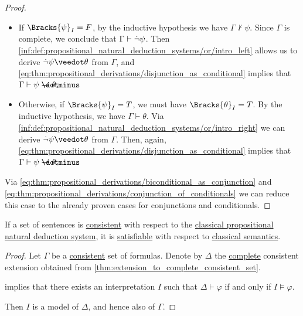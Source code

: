 \begin{proof}
  \begin{itemize}
    \item If \( \Bracks{\psi}_I = F \), by the inductive hypothesis we have \( \Gamma \not\vdash \psi \). Since \( \Gamma \) is complete, we conclude that \( \Gamma \vdash \dot{\neg} \psi \). Then \ref{inf:def:propositional_natural_deduction_systems/or/intro_left} allows us to derive \( \synneg \psi \synvee \theta \) from \( \Gamma \), and \eqref{eq:thm:propositional_derivations/disjunction_as_conditional} implies that \( \Gamma \vdash \psi \synimplies \theta \).

    \item Otherwise, if \( \Bracks{\psi}_I = T \), we must have \( \Bracks{\theta}_I = T \). By the inductive hypothesis, we have \( \Gamma \vdash \theta \). Via \ref{inf:def:propositional_natural_deduction_systems/or/intro_right} we can derive \( \synneg \psi \synvee \theta \) from \( \Gamma \). Then, again, \eqref{eq:thm:propositional_derivations/disjunction_as_conditional} implies that \( \Gamma \vdash \psi \synimplies \theta \).
  \end{itemize}

   Via \eqref{eq:thm:propositional_derivations/biconditional_as_conjunction} and \eqref{eq:thm:propositional_derivations/conjunction_of_conditionals} we can reduce this case to the already proven cases for conjunctions and conditionals.
\end{proof}

\begin{corollary}\label{thm:consistent_implies_satisfiable}
  If a set of sentences is \hyperref[def:consistent_set_of_sentences]{consistent} with respect to the \hyperref[def:abstract_natural_deduction_system]{classical propositional natural deduction system}, it is \hyperref[def:satisfiable_set_of_sentences]{satisfiable} with respect to \hyperref[def:propositional_semantics/classical]{classical semantics}.
\end{corollary}
\begin{proof}
  Let \( \Gamma \) be a \hyperref[def:consistent_set_of_sentences]{consistent} set of formulas. Denote by \( \Delta \) the \hyperref[def:complete_set_of_sentences]{complete} consistent extension obtained from \cref{thm:extension_to_complete_consistent_set}.

   implies that there exists an interpretation \( I \) such that \( \Delta \vdash \varphi \) if and only if \( I \vDash \varphi \).

  Then \( I \) is a model of \( \Delta \), and hence also of \( \Gamma \).
\end{proof}

